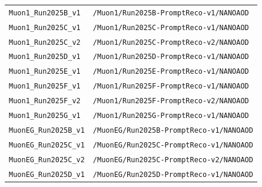 \begin{longtable}{@{}>{\RaggedRight\arraybackslash}p{} >{\RaggedRight\arraybackslash}p{}@{}}
\addlinespace[2pt]
\texttt{Muon1\_\allowbreak{}Run2025B\_\allowbreak{}v1} & \texttt{/\allowbreak{}Muon1/\allowbreak{}Run2025B-\allowbreak{}PromptReco-\allowbreak{}v1/\allowbreak{}NANOAOD} \\
\addlinespace[2pt]
\texttt{Muon1\_\allowbreak{}Run2025C\_\allowbreak{}v1} & \texttt{/\allowbreak{}Muon1/\allowbreak{}Run2025C-\allowbreak{}PromptReco-\allowbreak{}v1/\allowbreak{}NANOAOD} \\
\addlinespace[2pt]
\texttt{Muon1\_\allowbreak{}Run2025C\_\allowbreak{}v2} & \texttt{/\allowbreak{}Muon1/\allowbreak{}Run2025C-\allowbreak{}PromptReco-\allowbreak{}v2/\allowbreak{}NANOAOD} \\
\addlinespace[2pt]
\texttt{Muon1\_\allowbreak{}Run2025D\_\allowbreak{}v1} & \texttt{/\allowbreak{}Muon1/\allowbreak{}Run2025D-\allowbreak{}PromptReco-\allowbreak{}v1/\allowbreak{}NANOAOD} \\
\addlinespace[2pt]
\texttt{Muon1\_\allowbreak{}Run2025E\_\allowbreak{}v1} & \texttt{/\allowbreak{}Muon1/\allowbreak{}Run2025E-\allowbreak{}PromptReco-\allowbreak{}v1/\allowbreak{}NANOAOD} \\
\addlinespace[2pt]
\texttt{Muon1\_\allowbreak{}Run2025F\_\allowbreak{}v1} & \texttt{/\allowbreak{}Muon1/\allowbreak{}Run2025F-\allowbreak{}PromptReco-\allowbreak{}v1/\allowbreak{}NANOAOD} \\
\addlinespace[2pt]
\texttt{Muon1\_\allowbreak{}Run2025F\_\allowbreak{}v2} & \texttt{/\allowbreak{}Muon1/\allowbreak{}Run2025F-\allowbreak{}PromptReco-\allowbreak{}v2/\allowbreak{}NANOAOD} \\
\addlinespace[2pt]
\texttt{Muon1\_\allowbreak{}Run2025G\_\allowbreak{}v1} & \texttt{/\allowbreak{}Muon1/\allowbreak{}Run2025G-\allowbreak{}PromptReco-\allowbreak{}v1/\allowbreak{}NANOAOD} \\
\addlinespace[2pt]
\texttt{MuonEG\_\allowbreak{}Run2025B\_\allowbreak{}v1} & \texttt{/\allowbreak{}MuonEG/\allowbreak{}Run2025B-\allowbreak{}PromptReco-\allowbreak{}v1/\allowbreak{}NANOAOD} \\
\addlinespace[2pt]
\texttt{MuonEG\_\allowbreak{}Run2025C\_\allowbreak{}v1} & \texttt{/\allowbreak{}MuonEG/\allowbreak{}Run2025C-\allowbreak{}PromptReco-\allowbreak{}v1/\allowbreak{}NANOAOD} \\
\addlinespace[2pt]
\texttt{MuonEG\_\allowbreak{}Run2025C\_\allowbreak{}v2} & \texttt{/\allowbreak{}MuonEG/\allowbreak{}Run2025C-\allowbreak{}PromptReco-\allowbreak{}v2/\allowbreak{}NANOAOD} \\
\addlinespace[2pt]
\texttt{MuonEG\_\allowbreak{}Run2025D\_\allowbreak{}v1} & \texttt{/\allowbreak{}MuonEG/\allowbreak{}Run2025D-\allowbreak{}PromptReco-\allowbreak{}v1/\allowbreak{}NANOAOD} \\

\end{longtable}
